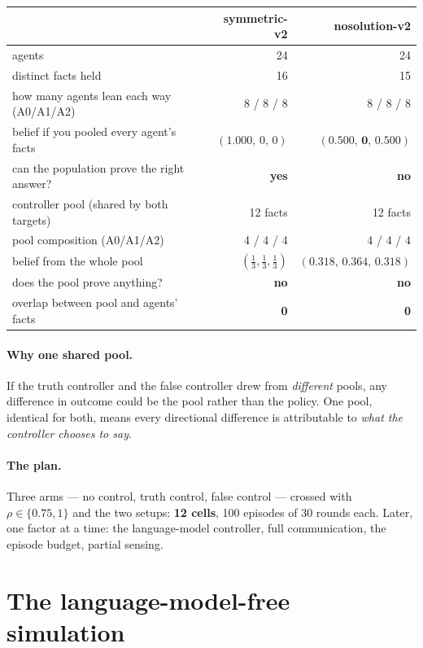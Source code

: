 \documentclass[11pt,a4paper]{article}
\begin{document}
\begin{center}\small
\begin{tabular}{lrr}\toprule
 & \textbf{symmetric-v2} & \textbf{nosolution-v2}\\\midrule
agents & 24 & 24\\
distinct facts held & 16 & 15\\
how many agents lean each way (A0/A1/A2) & 8 / 8 / 8 & 8 / 8 / 8\\
belief if you pooled every agent's facts & $(1.000,\,0,\,0)$ & $\mathbf{(0.500,\,0,\,0.500)}$\\
can the population prove the right answer? & \textbf{yes} & \textbf{no}\\
\midrule
controller pool (shared by both targets) & 12 facts & 12 facts\\
pool composition (A0/A1/A2) & 4 / 4 / 4 & 4 / 4 / 4\\
belief from the whole pool & $(\tfrac13,\tfrac13,\tfrac13)$ & $(0.318,\,0.364,\,0.318)$\\
does the pool prove anything? & \textbf{no} & \textbf{no}\\
overlap between pool and agents' facts & \textbf{0} & \textbf{0}\\
\bottomrule\end{tabular}\end{center}

\paragraph{Why one shared pool.} If the truth controller and the false
controller drew from \emph{different} pools, any difference in outcome could be
the pool rather than the policy. One pool, identical for both, means every
directional difference is attributable to \emph{what the controller chooses to
say}.

\paragraph{The plan.} Three arms --- no control, truth control, false control ---
crossed with $\rho\in\{0.75,1\}$ and the two setups: \textbf{12 cells},
100 episodes of 30 rounds each. Later, one factor at a time: the language-model
controller, full communication, the episode budget, partial sensing.

\section{The language-model-free simulation}
\end{document}
